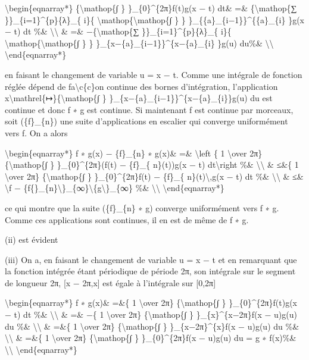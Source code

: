 \documentclass[]{article}
\begin{document}
\textbackslash{}begin\{eqnarray*\} \{\textbackslash{}mathop\{∫ \}
\}\_\{0\}\^{}\{2π\}f(t)g(x − t) dt\& =\& \{\textbackslash{}mathop\{∑
\}\}\_\{i=1\}\^{}\{p\}\{λ\}\_\{ i\}\{
\textbackslash{}mathop\{\textbackslash{}mathop\{∫ \} \}
\}\_\{\{a\}\_\{i−1\}\}\^{}\{\{a\}\_\{i\} \}g(x − t) dt \%\&
\textbackslash{}\textbackslash{} \& =\& −\{\textbackslash{}mathop\{∑
\}\}\_\{i=1\}\^{}\{p\}\{λ\}\_\{ i\}\{
\textbackslash{}mathop\{\textbackslash{}mathop\{∫ \} \}
\}\_\{x−\{a\}\_\{i−1\}\}\^{}\{x−\{a\}\_\{i\} \}g(u) du\%\&
\textbackslash{}\textbackslash{} \textbackslash{}end\{eqnarray*\}

en faisant le changement de variable u = x − t. Comme une intégrale de
fonction réglée dépend de fa\textbackslash{}c\{c\}on continue des bornes
d'intégration, l'application
x\textbackslash{}mathrel\{↦\}\{\textbackslash{}mathop\{∫ \}
\}\_\{x−\{a\}\_\{i−1\}\}\^{}\{x−\{a\}\_\{i\}\}g(u) du est continue et
donc f ∗ g est continue. Si maintenant f est continue par morceaux, soit
(\{f\}\_\{n\}) une suite d'applications en escalier qui converge
uniformément vers f. On a alors

\textbackslash{}begin\{eqnarray*\} \textbar{}f ∗ g(x) − \{f\}\_\{n\} ∗
g(x)\& =\& \textbackslash{}left \textbar{}\{ 1 \textbackslash{}over 2π\}
\{\textbackslash{}mathop\{∫ \} \}\_\{0\}\^{}\{2π\}(f(t) − \{f\}\_\{
n\}(t))g(x − t) dt\textbackslash{}right \textbar{}\%\&
\textbackslash{}\textbackslash{} \& ≤\&\{ 1 \textbackslash{}over 2π\}
\{\textbackslash{}mathop\{∫ \} \}\_\{0\}\^{}\{2π\}\textbar{}f(t) −
\{f\}\_\{ n\}(t)\textbar{}\textbackslash{},\textbar{}g(x − t)\textbar{}
dt \%\& \textbackslash{}\textbackslash{} \& ≤\&
\textbackslash{}\textbar{}f −
\{f\{\}\_\{n\}\textbackslash{}\textbar{}\}\_\{∞\}\textbackslash{}\textbar{}\{g\textbackslash{}\textbar{}\}\_\{∞\}
\%\& \textbackslash{}\textbackslash{} \textbackslash{}end\{eqnarray*\}

ce qui montre que la suite (\{f\}\_\{n\} ∗ g) converge uniformément vers
f ∗ g. Comme ces applications sont continues, il en est de même de f ∗
g.

(ii) est évident

(iii) On a, en faisant le changement de variable u = x − t et en
remarquant que la fonction intégrée étant périodique de période 2π, son
intégrale sur le segment de longueur 2π, {[}x − 2π,x{]} est égale à
l'intégrale sur {[}0,2π{]}

\textbackslash{}begin\{eqnarray*\} f ∗ g(x)\& =\&\{ 1
\textbackslash{}over 2π\} \{\textbackslash{}mathop\{∫ \}
\}\_\{0\}\^{}\{2π\}f(t)g(x − t) dt \%\& \textbackslash{}\textbackslash{}
\& =\& −\{ 1 \textbackslash{}over 2π\} \{\textbackslash{}mathop\{∫ \}
\}\_\{x\}\^{}\{x−2π\}f(x − u)g(u) du \%\&
\textbackslash{}\textbackslash{} \& =\&\{ 1 \textbackslash{}over 2π\}
\{\textbackslash{}mathop\{∫ \} \}\_\{x−2π\}\^{}\{x\}f(x − u)g(u) du \%\&
\textbackslash{}\textbackslash{} \& =\&\{ 1 \textbackslash{}over 2π\}
\{\textbackslash{}mathop\{∫ \} \}\_\{0\}\^{}\{2π\}f(x − u)g(u) du = g ∗
f(x)\%\& \textbackslash{}\textbackslash{}
\textbackslash{}end\{eqnarray*\}
\end{document}
